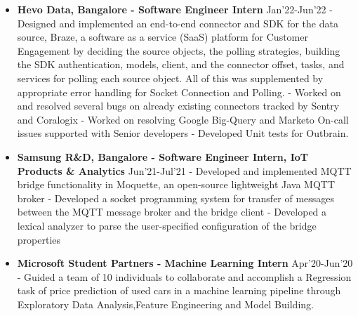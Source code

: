 \documentclass{article}
\begin{document}
\begin{itemize}

    \item{\textbf{\large{Hevo Data, Bangalore - Software Engineer Intern}}} \hfill \textmd{Jan'22-Jun'22}
          \newline
          \textmd{- Designed and implemented an end-to-end connector and SDK for the data source, Braze, a software as a service (SaaS) platform for Customer Engagement by deciding the source objects, the polling strategies, building the SDK authentication, models, client, and the connector offset, tasks, and services for polling each source object. All of this was supplemented by appropriate error handling for Socket Connection and Polling.}
          \newline
          \textmd{- Worked on and resolved several bugs on already existing connectors tracked by Sentry and Coralogix}
          \newline
          \textmd{- Worked on resolving Google Big-Query and Marketo On-call issues supported with Senior developers}
          \newline
          \textmd{- Developed Unit tests for Outbrain.}

    \item{\textbf{\large{Samsung R\&D, Bangalore - Software Engineer Intern, IoT Products \& Analytics}}} \hfill \textmd{Jun'21-Jul'21}
          \newline
          \textmd{- Developed and implemented MQTT bridge functionality in Moquette, an open-source lightweight Java MQTT broker}
          \newline
          \textmd{- Developed a socket programming system for transfer of messages between the MQTT message broker and the bridge client}
          \newline
          \textmd{- Developed a lexical analyzer to parse the user-specified configuration of the bridge properties}

    \item{\textbf{\large{Microsoft Student Partners - Machine Learning Intern}}} \hfill \textmd{Apr'20-Jun'20}
          \newline
          \textmd{- Guided a team of 10 individuals to collaborate and accomplish a Regression task of price prediction of used cars in a machine learning pipeline through Exploratory Data Analysis,Feature Engineering and Model Building.}


\end{itemize}
\end{document}
